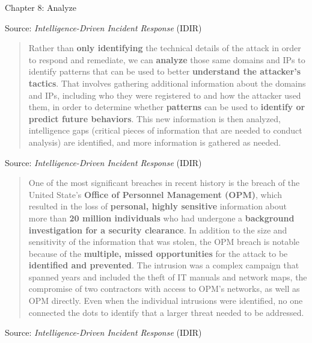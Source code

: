 \documentclass[Screen16to9,17pt]{foils}
\begin{document}
\begin{list2}
\item Chapter 8: Analyze
\end{list2}


Source: \emph{Intelligence-Driven Incident Response} (IDIR)





\begin{quote}
Rather than {\bf only identifying} the technical details of the attack in order to respond and remediate, we can {\bf analyze} those same domains and IPs to identify patterns that can be used to better {\bf understand the attacker’s tactics}. That involves gathering additional information about the domains and IPs, including who they were registered to and how the attacker used them, in order to determine whether {\bf patterns} can be used to {\bf identify or predict future behaviors}. This new information is then analyzed, intelligence gaps (critical pieces of information that are needed to conduct analysis) are identified, and more information is gathered as needed.
\end{quote}
Source: \emph{Intelligence-Driven Incident Response} (IDIR)




\begin{quote}
One of the most significant breaches in recent history is the breach of the United State’s {\bf Office of Personnel Management (OPM)}, which resulted in the loss of {\bf personal, highly sensitive} information about more than {\bf 20 million individuals} who had undergone a {\bf background investigation for a security clearance}. In addition to the size and sensitivity of the information that was stolen, the OPM breach is notable because
of the {\bf multiple, missed opportunities} for the attack to be {\bf identified and prevented}. The intrusion was a complex campaign that spanned years and included the theft of IT manuals and network maps, the compromise of two contractors with access to OPM’s networks, as well as OPM directly. Even when the individual intrusions were identified, no one connected the dots to identify that a larger threat needed to be addressed.
\end{quote}
Source: \emph{Intelligence-Driven Incident Response} (IDIR)
\end{document}
